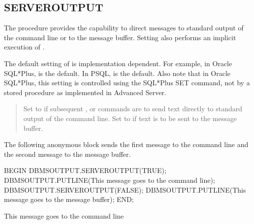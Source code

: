 \documentclass[letterpaper,10pt,english,openany,oneside]{sphinxmanual}
\begin{document}
\newpage


\subsection{SERVEROUTPUT}
\label{\detokenize{dbms_output:serveroutput}}
The  procedure provides the capability to direct messages to
standard output of the command line or to the message buffer. Setting
 also performs an implicit execution of .

The default setting of  is implementation dependent. For
example, in Oracle SQL*Plus,  is the default. In
PSQL,  is the default. Also note that in Oracle
SQL*Plus, this setting is controlled using the SQL*Plus SET command,
not by a stored procedure as implemented in Advanced Server.
\begin{quote}

\end{quote}


\begin{quote}

Set to  if subsequent , or  commands are to
send text directly to standard output of the command line. Set to 
if text is to be sent to the message buffer.
\end{quote}


The following anonymous block sends the first message to the command
line and the second message to the message buffer.

%
\begin{sphinxVerbatim}[commandchars=\\\{\}]
BEGIN
    DBMS\PYGZus{}OUTPUT.SERVEROUTPUT(TRUE);
    DBMS\PYGZus{}OUTPUT.PUT\PYGZus{}LINE(\PYGZsq{}This message goes to the command line\PYGZsq{});
    DBMS\PYGZus{}OUTPUT.SERVEROUTPUT(FALSE);
    DBMS\PYGZus{}OUTPUT.PUT\PYGZus{}LINE(\PYGZsq{}This message goes to the message buffer\PYGZsq{});
END;

This message goes to the command line
\end{sphinxVerbatim}
\end{document}
